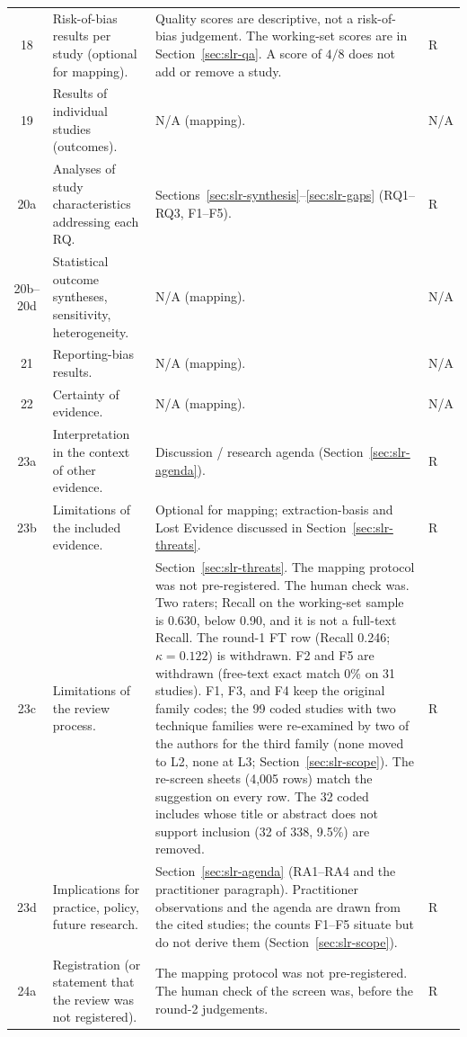 \begin{longtable}{c p{4.4cm} p{6.6cm} l}
18 & Risk-of-bias results per study (optional for mapping). & Quality scores are descriptive, not a risk-of-bias judgement. The working-set scores are in Section~\ref{sec:slr-qa}. A score of $4/8$ does not add or remove a study. & R \\
19 & Results of individual studies (outcomes). & N/A (mapping). & N/A \\
20a & Analyses of study characteristics addressing each RQ. & Sections~\ref{sec:slr-synthesis}--\ref{sec:slr-gaps} (RQ1--RQ3, F1--F5). & R \\
20b--20d & Statistical outcome syntheses, sensitivity, heterogeneity. & N/A (mapping). & N/A \\
21 & Reporting-bias results. & N/A (mapping). & N/A \\
22 & Certainty of evidence. & N/A (mapping). & N/A \\
23a & Interpretation in the context of other evidence. & Discussion / research agenda (Section~\ref{sec:slr-agenda}). & R \\
23b & Limitations of the included evidence. & Optional for mapping; extraction-basis and Lost Evidence discussed in Section~\ref{sec:slr-threats}. & R \\
23c & Limitations of the review process. & Section~\ref{sec:slr-threats}. The mapping protocol was not pre-registered. The human check was. Two raters; Recall on the working-set sample is 0.630, below 0.90, and it is not a full-text Recall. The round-1 FT row (Recall 0.246; $\kappa = 0.122$) is withdrawn. F2 and F5 are withdrawn (free-text exact match 0\% on 31 studies). F1, F3, and F4 keep the original family codes; the 99 coded studies with two technique families were re-examined by two of the authors for the third family (none moved to L2, none at L3; Section~\ref{sec:slr-scope}). The re-screen sheets (4{,}005 rows) match the suggestion on every row. The 32 coded includes whose title or abstract does not support inclusion (32 of 338, 9.5\%) are removed. & R \\
23d & Implications for practice, policy, future research. & Section~\ref{sec:slr-agenda} (RA1--RA4 and the practitioner paragraph). Practitioner observations and the agenda are drawn from the cited studies; the counts F1--F5 situate but do not derive them (Section~\ref{sec:slr-scope}). & R \\
24a & Registration (or statement that the review was not registered). & The mapping protocol was not pre-registered. The human check of the screen was, before the round-2 judgements. & R \\

\end{longtable}
